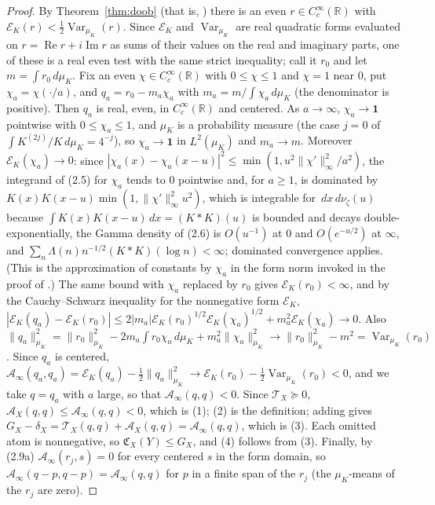 \documentclass[11pt]{amsart}
\theoremstyle{definition}
\theoremstyle{remark}
\newcommand{\R}{\mathbb R}
\newcommand{\dd}{\,d}
\newcommand{\EK}{\mathscr E_K}
\DeclareMathOperator{\Var}{Var}
\begin{document}
\begin{proof}
By Theorem~\ref{thm:doob} (that is, \cite[Theorem~13.2 and
Corollary~23.2]{TrejoPizzo39}) there is an even
\(r\in C_c^\infty(\R)\) with \(\EK(r)<\frac12\Var_{\mu_K}(r)\).  Since
\(\EK\) and \(\Var_{\mu_K}\) are real quadratic forms evaluated on
\(r=\operatorname{Re}r+i\operatorname{Im}r\) as sums of their values on
the real and imaginary parts, one of these is a real even test with the
same strict inequality; call it \(r_0\) and let \(m=\int r_0\dd\mu_K\).
Fix an even \(\chi\in C_c^\infty(\R)\) with \(0\le\chi\le1\) and
\(\chi=1\) near \(0\), put \(\chi_a=\chi(\cdot/a)\), and
\(q_a=r_0-m_a\chi_a\) with \(m_a=m/\int\chi_a\dd\mu_K\) (the denominator
is positive).  Then \(q_a\) is real, even, in \(C_c^\infty(\R)\) and
centered.  As \(a\to\infty\), \(\chi_a\to\mathbf 1\) pointwise with
\(0\le\chi_a\le1\), and \(\mu_K\) is a probability measure (the case
\(j=0\) of \(\int K^{(2j)}/K\dd\mu_K=4^{-j}\)), so \(\chi_a\to\mathbf 1\)
in \(L^2(\mu_K)\) and \(m_a\to m\).  Moreover \(\EK(\chi_a)\to0\): since
\(|\chi_a(x)-\chi_a(x-u)|^2\le\min(1,u^2\|\chi'\|_\infty^2/a^2)\), the
integrand of (2.5) for \(\chi_a\) tends to \(0\) pointwise and, for
\(a\ge1\), is dominated by \(K(x)K(x-u)\min(1,\|\chi'\|_\infty^2u^2)\),
which is integrable for \(\dd x\dd\nu_\zeta(u)\) because
\(\int K(x)K(x-u)\dd x=(K*K)(u)\) is bounded and decays
double-exponentially, the Gamma density of (2.6) is
\(O(u^{-1})\) at \(0\) and \(O(e^{-u/2})\) at \(\infty\), and
\(\sum_n\Lambda(n)n^{-1/2}(K*K)(\log n)<\infty\); dominated convergence
applies.  (This is the approximation of constants by \(\chi_a\) in the
form norm invoked in the proof of \cite[Corollary~23.2]{TrejoPizzo39}.)
The same bound with \(\chi_a\) replaced by \(r_0\) gives
\(\EK(r_0)<\infty\), and by the Cauchy--Schwarz inequality for the
nonnegative form \(\EK\),
\(|\EK(q_a)-\EK(r_0)|\le2|m_a|\EK(r_0)^{1/2}\EK(\chi_a)^{1/2}
+m_a^2\EK(\chi_a)\to0\).  Also
\(\|q_a\|_{\mu_K}^2=\|r_0\|_{\mu_K}^2-2m_a\int r_0\chi_a\dd\mu_K
+m_a^2\|\chi_a\|_{\mu_K}^2\to\|r_0\|_{\mu_K}^2-m^2=\Var_{\mu_K}(r_0)\).
Since \(q_a\) is centered,
\(\mathcal A_\infty(q_a,q_a)=\EK(q_a)-\frac12\|q_a\|_{\mu_K}^2\to
\EK(r_0)-\frac12\Var_{\mu_K}(r_0)<0\), and we take \(q=q_a\) with \(a\)
large, so that \(\mathcal A_\infty(q,q)<0\).  Since
\(\mathcal T_X\succeq0\), \(\mathcal A_X(q,q)\le\mathcal A_\infty(q,q)<0\),
which is (1); (2) is the definition; adding gives
\(G_X-\delta_X=\mathcal T_X(q,q)+\mathcal A_X(q,q)=\mathcal A_\infty(q,q)\),
which is (3).  Each omitted atom is nonnegative, so
\(\mathfrak C_X(Y)\le G_X\), and (4) follows from (3).  Finally, by (2.9a)
\(\mathcal A_\infty(r_j,s)=0\) for every centered \(s\) in the form domain,
so \(\mathcal A_\infty(q-p,q-p)=\mathcal A_\infty(q,q)\) for \(p\) in a
finite span of the \(r_j\) (the \(\mu_K\)-means of the \(r_j\) are zero).
\end{proof}
\end{document}
